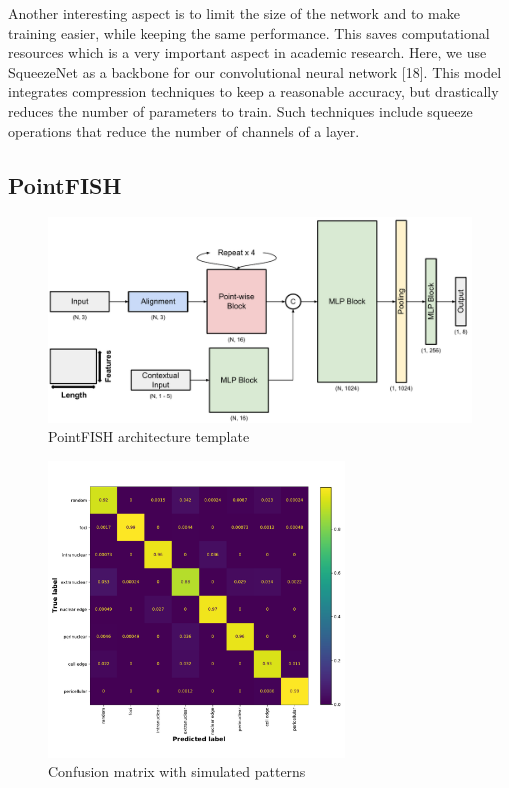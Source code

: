Another interesting aspect is to limit the size of the network and to make
training easier, while keeping the same performance. This saves computational
resources which is a very important aspect in academic research. Here, we use
SqueezeNet as a backbone for our convolutional neural network [18]. This model
integrates compression techniques to keep a reasonable accuracy, but drastically
reduces the number of parameters to train. Such techniques include squeeze
operations that reduce the number of channels of a layer.


\subsection{PointFISH} \label{subsec:pointfish}


\begin{figure}[h]
    \centering
    \includegraphics[width=1\textwidth]{figures/chapter4/PointFISH_architecture}
    \caption{PointFISH architecture template}
    \label{fig:PointFISH_architecture}
\end{figure}

\begin{figure}[h]
    \centering
    \includegraphics[width=0.7\textwidth]{figures/chapter4/confusion_matrix}
    \caption{Confusion matrix with simulated patterns}
    \label{fig:confusion_matrix}
\end{figure}


